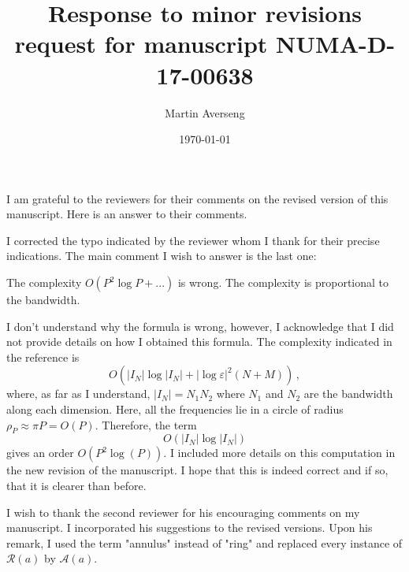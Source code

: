 \documentclass[10pt]{article}
\title{Response to minor revisions request for manuscript
		NUMA-D-17-00638 \\}
\author{Martin Averseng}
\date{\today}
\begin{document}
	
	I am grateful to the reviewers for their comments on the revised version of this manuscript. Here is an answer to their comments.
	
	
	I corrected the typo indicated by the reviewer whom I thank for their precise indications. The main comment I wish to answer is the last one:
	\begin{response}
		{The complexity $O(P ^2 \log P+ ...)$ is wrong. The complexity is proportional to the bandwidth.}
	\end{response}	
	I don't understand why the formula is wrong, however, I acknowledge  that I did not provide details on how I obtained this formula. The complexity indicated in the reference is 
	\[O( |I_N| \log |I_N| + |\log \varepsilon|^2\left(N + M\right))\,,\]
	where, as far as I understand, $|I_N| = N_1 N_2$  where $N_1$ and $N_2$ are the bandwidth along each dimension. Here, all the frequencies lie in a circle of radius $\rho_P \approx \pi P = O(P).$ Therefore, the term 
	\[O(|I_N| \log |I_N|)\]
	gives an order $O(P^2 \log(P))$. 
	I included more details on this computation in the new revision of the manuscript. I hope that this is indeed correct and if so, that it is clearer than before. 
	
	
	I wish to thank the second reviewer for his encouraging comments on my manuscript. I incorporated his suggestions to the revised versions.
	Upon his remark, I used the term "annulus" instead of "ring" and replaced every instance of $\mathcal{R}(a)$ by $\mathcal{A}(a)$. 
	
	  
	
\end{document}
